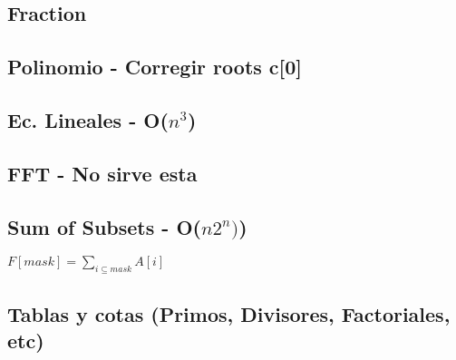 \subsection{Fraction} %
\subsection{Polinomio - {\color{red}Corregir roots c[0]}}
\subsection{Ec. Lineales - O($n^3$)}
\subsection{FFT - {\color{red} No sirve esta}}
\subsection{Sum of Subsets - O($n 2^n)$)}
$F[mask] = \sum_{i \subseteq mask} A[i]$
\subsection{Tablas y cotas (Primos, Divisores, Factoriales, etc)}
 
